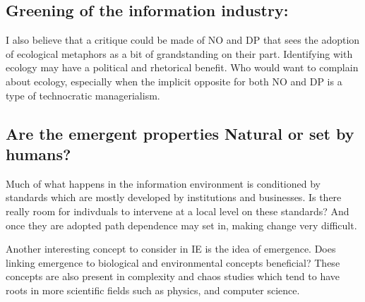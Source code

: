 \subsection{Greening of the information industry:}

I also believe that a critique could be made of NO and DP that sees the adoption of ecological metaphors as a bit of grandstanding on their part. Identifying with ecology may have a political and rhetorical benefit. Who would want to complain about ecology, especially when the implicit opposite for both NO and DP is a type of technocratic managerialism.

\subsection{Are the emergent properties Natural or set by humans?}

Much of what happens in the information environment is conditioned by standards which are mostly developed by institutions and businesses. Is there really room for indivduals to intervene at a local level on these standards? And once they are adopted path dependence may set in, making change very difficult.

Another interesting concept to consider in IE is the idea of emergence. Does linking emergence to biological and environmental concepts beneficial? These concepts are also present in complexity and chaos studies which tend to have roots in more scientific fields such as physics, and computer science.
